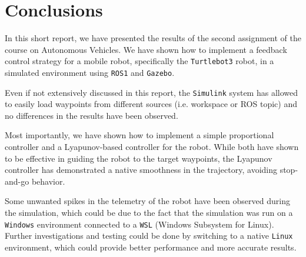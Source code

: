 \section{Conclusions}
\label{sec:conclusions}

In this short report, we have presented the results of the second assignment of the course on Autonomous Vehicles.
We have shown how to implement a feedback control strategy for a mobile robot, specifically the \texttt{Turtlebot3} robot, in a simulated environment using \texttt{ROS1} and \texttt{Gazebo}.

Even if not extensively discussed in this report, the \texttt{Simulink} system has allowed to easily load waypoints from different sources (i.e. workspace or ROS topic) and no differences in the results have been observed.

Most importantly, we have shown how to implement a simple proportional controller and a Lyapunov-based controller for the robot.
While both have shown to be effective in guiding the robot to the target waypoints, the Lyapunov controller has demonstrated a native smoothness in the trajectory, avoiding stop-and-go behavior.

Some unwanted spikes in the telemetry of the robot have been observed during the simulation, which could be due to the fact that the simulation was run on a \texttt{Windows} environment connected to a \texttt{WSL} (Windows Subsystem for Linux).
Further investigations and testing could be done by switching to a native \texttt{Linux} environment, which could provide better performance and more accurate results.